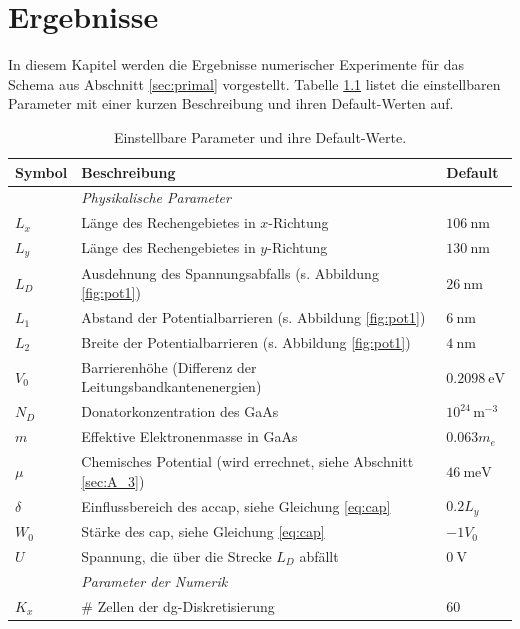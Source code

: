 \chapter{Ergebnisse}
In diesem Kapitel werden die Ergebnisse numerischer Experimente für das Schema aus Abschnitt \ref{sec:primal} vorgestellt. Tabelle \ref{tab:parameter} listet die einstellbaren Parameter mit einer kurzen Beschreibung und ihren Default-Werten auf.
\begin{table}
  \centering
  \caption{Einstellbare Parameter und ihre Default-Werte.}
  \label{tab:parameter}
  \scriptsize
  \begin{tabular}{p{} p{} p{}  }
    \toprule
    {Symbol} & Beschreibung & Default \\
    \midrule
       & \emph{Physikalische Parameter} & \\
    $L_x$ &Länge des Rechengebietes in $x$-Richtung & $\SI{106}{\nano\meter}$ \\
    $L_y$ &Länge des Rechengebietes in $y$-Richtung & $\SI{130}{\nano\meter}$ \\
    $L_D$ & Ausdehnung des Spannungsabfalls (s. Abbildung \ref{fig:pot1}) & $\SI{26}{\nano\meter}$\\
    $L_1$ & Abstand der Potentialbarrieren (s. Abbildung \ref{fig:pot1}) &$\SI{6}{\nano\meter}$ \\
    $L_2$ & Breite der Potentialbarrieren  (s. Abbildung \ref{fig:pot1}) &$\SI{4}{\nano\meter}$ \\
    $V_0$ & Barrierenhöhe (Differenz der Leitungsbandkantenenergien) &$\SI{0.2098}{\electronvolt}$ \\
    $N_D$ & Donatorkonzentration des GaAs & $10^{24}\,\text{m}^{-3}$ \\
    $m$ & Effektive Elektronenmasse in GaAs & $0.063 m_e$ \\
    $\mu$   & Chemisches Potential (wird errechnet, siehe Abschnitt \ref{sec:A_3}) & $\SI{46}{\milli\electronvolt}$ \\
    $\delta$ & Einflussbereich des ac{cap}, siehe Gleichung \eqref{eq:cap} & $0.2 L_y$\\
    $W_0$ & Stärke des \ac{cap}, siehe Gleichung \eqref{eq:cap} &$-1V_0$ \\
    $U$   &Spannung, die über die Strecke $L_D$ abfällt & $\SI{0}{\volt}$ \\
    \midrule
     & \emph{Parameter der Numerik} & \\
    $K_x$ & \# Zellen der \ac{dg}-Diskretisierung & 60 \\

\end{tabular}
\end{table}
